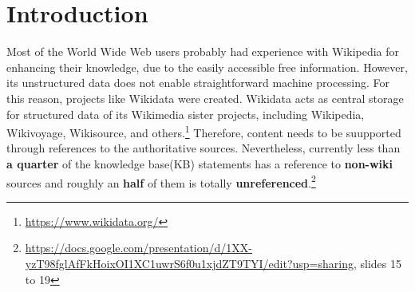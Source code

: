 \chapter{Introduction}
\label{cha:intro}
Most of the World Wide Web users probably had experience with Wikipedia for enhancing their knowledge, due to the easily accessible free information. However, its unstructured data does not enable straightforward machine processing. For this reason, projects like Wikidata were created. Wikidata acts as central storage for structured data of its Wikimedia sister projects, including Wikipedia, Wikivoyage, Wikisource, and others.\footnote{\url{https://www.wikidata.org/}}
Therefore, content needs to be suupported through references to the authoritative sources. Nevertheless, currently less than \textbf{a quarter} of the knowledge base(KB) statements has a reference to \textbf{non-wiki} sources and roughly an \textbf{half} of them is totally \textbf{unreferenced}.\footnote{\url{https://docs.google.com/presentation/d/1XX-yzT98fglAfFkHoixOI1XC1uwrS6f0u1xjdZT9TYI/edit?usp=sharing}, slides 15 to 19}

